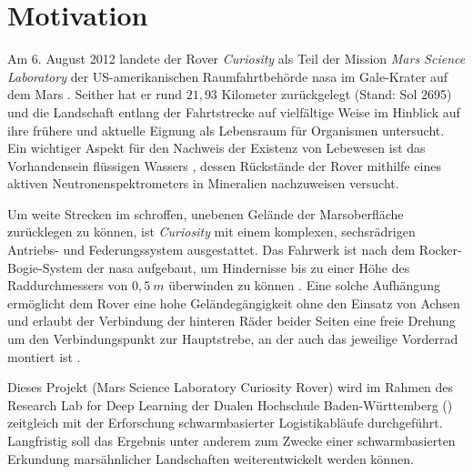 



\section{Motivation}
\label{sec:motivation}

Am 6. August 2012 landete der Rover \textit{Curiosity} als Teil der Mission \textit{Mars Science Laboratory} der US-amerikanischen Raumfahrtbehörde \acf{nasa} im Gale-Krater auf dem Mars \cite{vasavada2014}.
Seither hat er rund $21{,}93$ Kilometer zurückgelegt (Stand: Sol 2695) \cite{nasa2020} und die Landschaft entlang der Fahrtstrecke auf vielfältige Weise im Hinblick auf ihre frühere und aktuelle Eignung als Lebensraum für Organismen untersucht.
Ein wichtiger Aspekt für den Nachweis der Existenz von Lebewesen ist das Vorhandensein flüssigen Wassers \cite{nasa2013}, dessen Rückstände der Rover mithilfe eines aktiven Neutronenspektrometers in Mineralien nachzuweisen versucht. \cite{vasavada2014}

Um weite Strecken im schroffen, unebenen Gelände der Marsoberfläche zurücklegen zu können, ist \textit{Curiosity} mit einem komplexen, sechsrädrigen Antriebs- und Federungssystem ausgestattet.
Das Fahrwerk ist nach dem Rocker-Bogie-System der \acs{nasa} aufgebaut, um Hindernisse bis zu einer Höhe des Raddurchmessers von $0{,}5\ m$ überwinden zu können \cite{arvidson2013}.
Eine solche Aufhängung ermöglicht dem Rover eine hohe Geländegängigkeit ohne den Einsatz von Achsen und erlaubt der Verbindung der hinteren Räder beider Seiten eine freie Drehung um den Verbindungspunkt zur Hauptstrebe, an der auch das jeweilige Vorderrad montiert ist \cite{bickler1998}. 


Dieses Projekt (Mars Science Laboratory Curiosity Rover) wird im Rahmen des Research Lab for Deep Learning der Dualen Hochschule Baden-Württemberg () zeitgleich mit der Erforschung schwarmbasierter Logistikabläufe durchgeführt.
Langfristig soll das Ergebnis unter anderem zum Zwecke einer schwarmbasierten Erkundung marsähnlicher Landschaften weiterentwickelt werden können.


